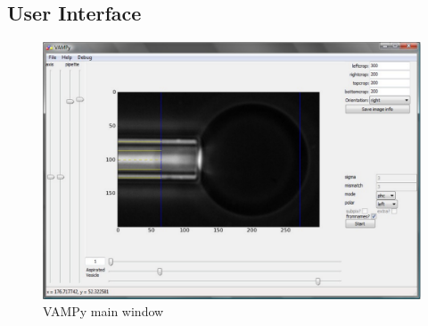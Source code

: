 \documentclass[a4paper,12pt]{article}
\begin{document}
\subsection{User Interface}\label{vampy-ui}
\begin{figure}[htbp]
	\centering
		\includegraphics[width=1.00\textwidth]{figs/vampy_ui.pdf}
	\caption{VAMPy main window}
	\label{fig:vampyui}
\end{figure}
\end{document}
